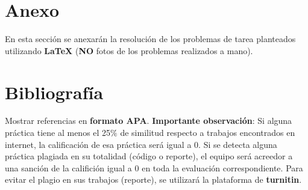 \documentclass[12pt,twoside]{article}
\begin{document}
\medskip


\section{Anexo}

En esta secci\'on se anexar\'an la resoluci\'on de los problemas de tarea planteados utilizando \textbf{LaTeX} (\textbf{NO} fotos de los problemas realizados a mano).




\section{Bibliograf\'ia}

Mostrar referencias en \textbf{formato APA}. \textbf{Importante observaci\'on}: Si alguna pr\'actica tiene al menos el 25$\%$ de similitud respecto a trabajos encontrados en internet, la calificaci\'on de esa pr\'actica ser\'a igual a 0. Si se detecta alguna pr\'actica plagiada en su totalidad (c\'odigo o reporte), el equipo ser\'a acreedor a una sanci\'on de la califici\'on igual a 0 en toda la evaluaci\'on correspondiente. Para evitar el plagio en sus trabajos (reporte), se utilizar\'a la plataforma de \textbf{turnitin}.

\medskip
\end{document}
